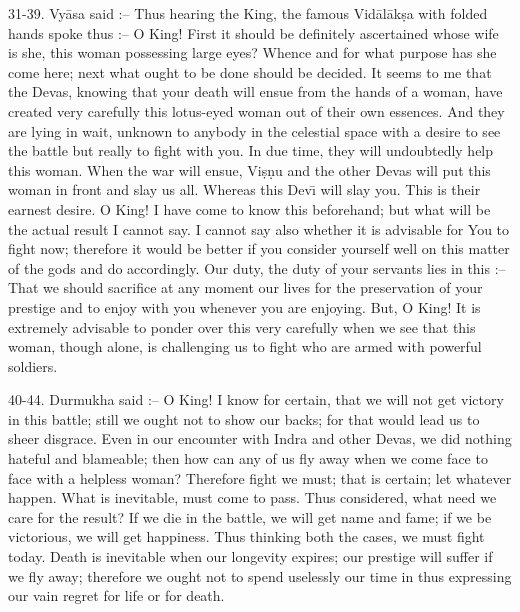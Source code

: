31-39. Vy\=asa said :-- Thus hearing the King, the famous Vid\=al\=ak\d{s}a with folded hands spoke thus :-- O King! First it should be definitely ascertained whose wife is she, this woman possessing large eyes? Whence and for what purpose has she come here; next what ought to be done should be decided. It seems to me that the Devas, knowing that your death will ensue from the hands of a woman, have created very carefully this lotus-eyed woman out of their own essences. And they are lying in wait, unknown to anybody in the celestial space with a desire to see the battle but really to fight with you. In due time, they will undoubtedly help this woman. When the war will ensue, Vi\d{s}\d{n}u and the other Devas will put this woman in front and slay us all. Whereas this Dev\={\i} will slay you. This is their earnest desire. O King! I have come to know this beforehand; but what will be the actual result I cannot say. I cannot say also whether it is advisable for You to fight now; therefore it would be better if you consider yourself well on this matter of the gods and do accordingly. Our duty, the duty of your servants lies in this :-- That we should sacrifice at any moment our lives for the preservation of your prestige and to enjoy with you whenever you are enjoying. But, O King! It is extremely advisable to ponder over this very carefully when we see that this woman, though alone, is challenging us to fight who are armed with powerful soldiers.

40-44. Durmukha said :-- O King! I know for certain, that we will not get victory in this battle; still we ought not to show our backs; for that would lead us to sheer disgrace. Even in our encounter with Indra and other Devas, we did nothing hateful and blameable; then how can any of us fly away when we come face to face with a helpless woman? Therefore fight we must; that is certain; let whatever happen. What is inevitable, must come to pass. Thus considered, what need we care for the result? If we die in the battle, we will get name and fame; if we be victorious, we will get happiness. Thus thinking both the cases, we must fight today. Death is inevitable when our longevity expires; our prestige will suffer if we fly away; therefore we ought not to spend uselessly our time in thus expressing our vain regret for life or for death.

